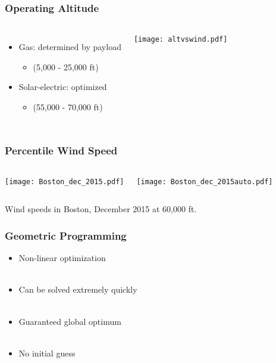 \documentclass{beamer}
\begin{document}
\begin{frame}
    \frametitle{Operating Altitude}
    
    \begin{columns}
        \begin{itemize}
            \item Gas: determined by payload
                \begin{itemize}
                    \item (5,000 - 25,000 ft)
                    \end{itemize}
            \item Solar-electric: optimized 
                \begin{itemize}
                    \item (55,000 - 70,000 ft)
                    \end{itemize}
                \end{itemize}
        
        \texttt{[image: altvswind.pdf]}
    \end{columns}

\end{frame}

\begin{frame}
    \frametitle{Percentile Wind Speed}
    
    \begin{columns}
        \texttt{[image: Boston\_dec\_2015.pdf]}
        
        \texttt{[image: Boston\_dec\_2015auto.pdf]}
    \end{columns}

    \begin{center}
    Wind speeds in Boston, December 2015 at 60,000 ft. 
    \end{center}
    
\end{frame}

\begin{frame}
    \frametitle{Geometric Programming}
    \begin{itemize}
        \item Non-linear optimization \\~\\
        \item Can be solved extremely quickly \\~\\
        \item Guaranteed global optimum \\~\\
        \item No initial guess
        \end{itemize}
\end{frame}
\end{document}
